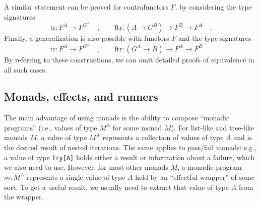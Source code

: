 A similar statement can be proved for contrafunctors $F$, by considering
the type signatures
\[
\text{tr}:F^{A}\rightarrow F^{G^{A}}\quad,\quad\quad\text{ftr}:(A\rightarrow G^{B})\rightarrow F^{B}\rightarrow F^{A}\quad.
\]
Finally, a generalization is also possible with functors $F$ and
the type signatures
\[
\text{tr}:F^{A}\rightarrow F^{G^{A}}\quad,\quad\quad\text{ftr}:(G^{A}\rightarrow B)\rightarrow F^{A}\rightarrow F^{B}\quad.
\]
By referring to these constructions, we can omit detailed proofs of
equivalence in all such cases.

\subsection{Monads, effects, and runners}

\begin{comment}
We introduced monads by generalizing nested iteration to type constructors
other than sequences, while imposing the same monad laws. We found
that the monad laws apply to a wide range of type constructors that
express different computational effects.
\end{comment}

The main advantage of using monads is the ability to compose \textsf{``}monadic
programs\textsf{''} (i.e., values of type $M^{A}$
for some monad $M$). For list-like and tree-like monads $M$, a value
of type $M^{A}$ represents a collection of values of type $A$ and
is the desired result of nested iterations. The same applies to pass/fail
monads: e.g., a value of type \lstinline!Try[A]! holds either a result
or information about a failure, which we also need to use. However,
for most other monads $M$, a monadic program $m:M^{A}$ represents
a single value of type $A$ held by an \textsf{``}effectful wrapper\textsf{''} of
some sort. To get a useful result, we usually need to extract that
value of type $A$ from the wrapper.

